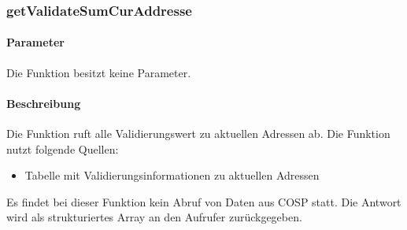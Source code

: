 \subsubsection{getValidateSumCurAddresse}
\paragraph{Parameter} Die Funktion besitzt keine Parameter.
\paragraph{Beschreibung} Die Funktion ruft alle Validierungswert zu aktuellen Adressen ab. Die Funktion nutzt folgende Quellen:
\begin{itemize}
	\item Tabelle mit Validierungsinformationen zu aktuellen Adressen
\end{itemize}
Es findet bei dieser Funktion kein Abruf von Daten aus {\glqq COSP\grqq} statt. Die Antwort wird als strukturiertes Array an den Aufrufer zurückgegeben.